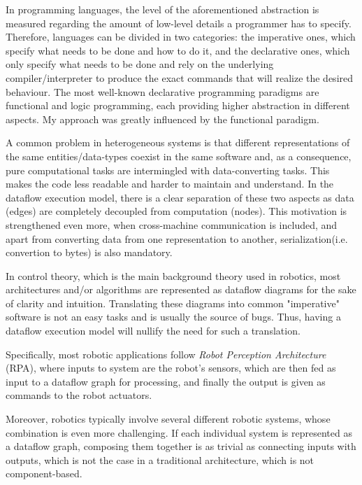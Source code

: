 \documentclass{dithesis}
\begin{document}
In programming languages, the level of the aforementioned abstraction is measured regarding the amount of low-level details a programmer has to specify. Therefore, languages can be divided in two categories: the imperative ones, which specify what needs to be done and how to do it, and the declarative ones, which only specify what needs to be done and rely on the underlying compiler/interpreter to produce the exact commands that will realize the desired behaviour. The most well-known declarative programming paradigms are functional and logic programming, each providing higher abstraction in different aspects. My approach was greatly influenced by the functional paradigm.


A common problem in heterogeneous systems is that different representations of the same entities/data-types coexist in the same software and, as a consequence, pure computational tasks are intermingled with data-converting tasks. This makes the code less readable and harder to maintain and understand. In the dataflow execution model, there is a clear separation of these two aspects as data (edges) are completely decoupled from computation (nodes). This motivation is strengthened even more, when cross-machine communication is included, and apart from converting data from one representation to another, serialization(i.e. convertion to bytes) is also mandatory.


In control theory, which is the main background theory used in robotics, most architectures and/or algorithms are represented as dataflow diagrams for the sake of clarity and intuition. Translating these diagrams into common "imperative" software is not an easy tasks and is usually the source of bugs. Thus, having a dataflow execution model will nullify the need for such a translation.

Specifically, most robotic applications follow \textit{Robot Perception Architecture} (RPA), where inputs to system are the robot's sensors, which are then fed as input to a dataflow graph for processing, and finally the output is given as commands to the robot actuators.

Moreover, robotics typically involve several different robotic systems, whose combination is even more challenging. If each individual system is represented as a dataflow graph, composing them together is as trivial as connecting inputs with outputs, which is not the case in a traditional architecture, which is not component-based.
\end{document}
